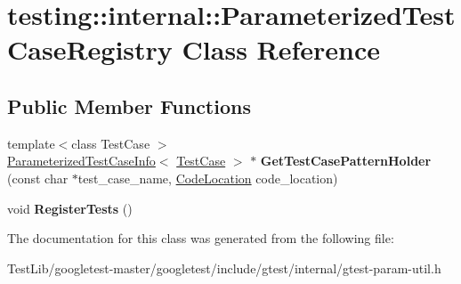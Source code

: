 \hypertarget{classtesting_1_1internal_1_1ParameterizedTestCaseRegistry}{}\section{testing\+:\+:internal\+:\+:Parameterized\+Test\+Case\+Registry Class Reference}
\label{classtesting_1_1internal_1_1ParameterizedTestCaseRegistry}
\subsection*{Public Member Functions}
\begin{DoxyCompactItemize}
\item 
\mbox{\label{classtesting_1_1internal_1_1ParameterizedTestCaseRegistry_af525816aa348f9e33f5d900965991388}} 
{\footnotesize template$<$class Test\+Case $>$ }\\\hyperlink{classtesting_1_1internal_1_1ParameterizedTestCaseInfo}{Parameterized\+Test\+Case\+Info}$<$ \hyperlink{classtesting_1_1TestCase}{Test\+Case} $>$ $\ast$ {\bfseries Get\+Test\+Case\+Pattern\+Holder} (const char $\ast$test\+\_\+case\+\_\+name, \hyperlink{structtesting_1_1internal_1_1CodeLocation}{Code\+Location} code\+\_\+location)
\item 
\mbox{\label{classtesting_1_1internal_1_1ParameterizedTestCaseRegistry_ad5b63c8fe94f3d51d039a76c001c9223}} 
void {\bfseries Register\+Tests} ()
\end{DoxyCompactItemize}


The documentation for this class was generated from the following file\+:\begin{DoxyCompactItemize}
\item 
Test\+Lib/googletest-\/master/googletest/include/gtest/internal/gtest-\/param-\/util.\+h\end{DoxyCompactItemize}
